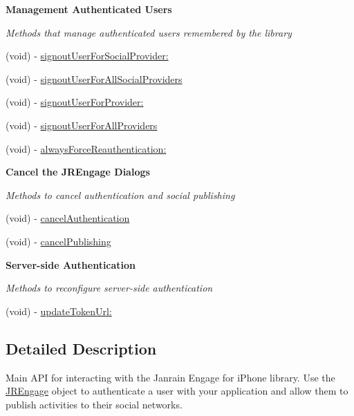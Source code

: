 \begin{Indent}{\bf Management Authenticated Users}\par
{\em \label{_amgrp4247d2361fbfb57c620ed69782a50c95}
 Methods that manage authenticated users remembered by the library }\begin{DoxyCompactItemize}
\item 
(void) -\/ \hyperlink{interface_j_r_engage_aede9ed92d80f14d85e59a982da3150fc}{signoutUserForSocialProvider:}
\item 
(void) -\/ \hyperlink{interface_j_r_engage_a1f4e27ed5dbc05892fd7bc2255d2afa8}{signoutUserForAllSocialProviders}
\item 
(void) -\/ \hyperlink{interface_j_r_engage_af1448791663265d3b739041983fbae92}{signoutUserForProvider:}
\item 
(void) -\/ \hyperlink{interface_j_r_engage_a56060e8d5fe94e4bf06ff3edf27af5ee}{signoutUserForAllProviders}
\item 
(void) -\/ \hyperlink{interface_j_r_engage_a66dca1abdfd5103480f9a87f65923a68}{alwaysForceReauthentication:}
\end{DoxyCompactItemize}
\end{Indent}
\begin{Indent}{\bf Cancel the JREngage Dialogs}\par
{\em \label{_amgrpd07ee85d05cc5dd13dd0e31682479a39}
 Methods to cancel authentication and social publishing }\begin{DoxyCompactItemize}
\item 
(void) -\/ \hyperlink{interface_j_r_engage_a17b67c9bb98230fb7d59f8c35a20662b}{cancelAuthentication}
\item 
(void) -\/ \hyperlink{interface_j_r_engage_a205c368338061976178a5b0e36f2d4f2}{cancelPublishing}
\end{DoxyCompactItemize}
\end{Indent}
\begin{Indent}{\bf Server-\/side Authentication}\par
{\em \label{_amgrp1fc6cae7bdf84f91a0bad45f5891f15e}
 Methods to reconfigure server-\/side authentication }\begin{DoxyCompactItemize}
\item 
(void) -\/ \hyperlink{interface_j_r_engage_ac0fb45ee43767dfdea0057bb93000db6}{updateTokenUrl:}
\end{DoxyCompactItemize}
\end{Indent}


\subsection{Detailed Description}
Main API for interacting with the Janrain Engage for iPhone library. Use the \hyperlink{interface_j_r_engage}{JREngage} object to authenticate a user with your application and allow them to publish activities to their social networks.


